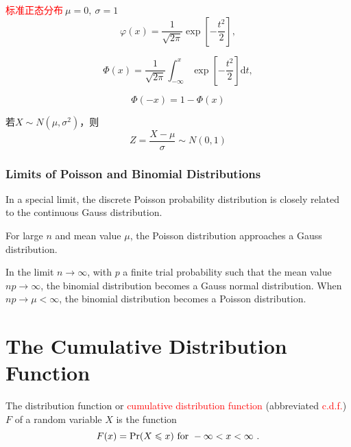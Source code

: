 \documentclass[12pt,a4paper]{article}
\newcommand{\dif}{\mathrm{d}}
\begin{document}
\textcolor{red}{标准正态分布}$~\mu = 0, ~\sigma = 1$
\begin{equation}
\varphi(x) = \frac{1}{\sqrt{2\pi}} \exp \left[-\frac{t^2}{2} \right], 
\end{equation}

\begin{equation}
\Phi(x) = \frac{1}{\sqrt{2\pi}} \int_{-\infty}^{x} \exp \left[-\frac{t^2}{2} \right] \dif t,
\end{equation}

\begin{equation}
\Phi(-x) = 1 -\Phi(x)
\end{equation}

若$X\sim N(\mu, \sigma^2)$，则
\begin{equation}
Z = \frac{X-\mu}{\sigma} \sim N(0,1)
\end{equation}


\subsubsection{Limits of Poisson and Binomial Distributions}
\cite{arfken} In a special limit, the discrete Poisson probability distribution is closely related to the continuous Gauss distribution.
\begin{tcolorbox}[colback=green!15,colframe=green!40!black,title= Theorem]
For large $n$ and mean value $\mu$, the Poisson distribution approaches a Gauss distribution. 
\end{tcolorbox}


\begin{tcolorbox}[colback=green!15,colframe=green!40!black,title= Theorem]
In the limit $n \rightarrow \infty$, with $p$ a finite trial probability such that the mean value $np \rightarrow \infty$, the binomial distribution becomes a Gauss normal distribution. When $np \rightarrow \mu < \infty$, the binomial distribution becomes a Poisson distribution.
\end{tcolorbox}


\section{The Cumulative Distribution Function}
The distribution function or \textcolor{red}{cumulative distribution function} (abbreviated \textcolor{red}{c.d.f.}) $F$ of a random variable $X$ is the function
\begin{equation}
F(x) = {\rm Pr}(X \leqslant x) ~{\rm for} ~ -\infty < x < \infty ~.
\end{equation}
\end{document}
